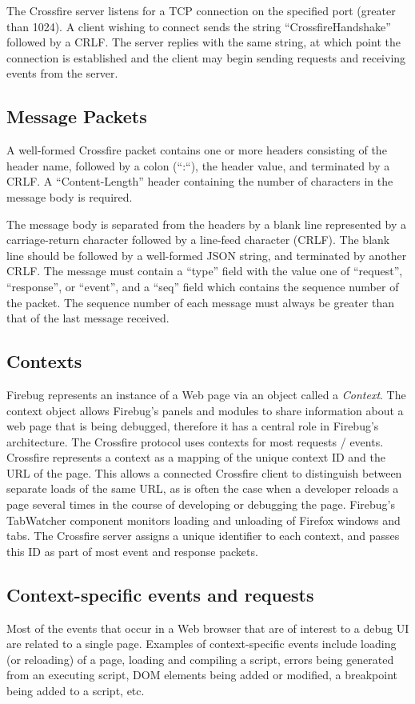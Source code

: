 The Crossfire server listens for a TCP connection on the specified port
(greater than 1024).  A client wishing to connect sends the string
``CrossfireHandshake'' followed by a CRLF. The server replies with the same
string, at which point the connection is established and the client may begin
sending requests and receiving events from the server.

\subsection {Message Packets}
A well-formed Crossfire packet contains one or more headers consisting of the
header name, followed by a colon (``:``), the header value, and terminated by a
CRLF. A ``Content-Length'' header containing the number of characters in the
message body is required.

The message body is separated from the headers by a blank line
represented by a carriage-return character followed by a line-feed
character (CRLF).
The blank line should be followed by a well-formed JSON string, and terminated
by another CRLF. The message must contain a ``type'' field with the value one of
``request'', ``response'', or ``event'', and a ``seq'' field which contains the
sequence number of the packet. The sequence number of each message must always
be greater than that of the last message received.

\subsection {Contexts}
Firebug represents an instance of a Web page via an object called a
\textit{Context}. The context object allows Firebug's panels and modules to
share information about a web page that is being debugged, therefore it has a
central role in Firebug's architecture. The Crossfire protocol uses contexts for
most requests / events. Crossfire represents a context as a mapping of the
unique context ID and the URL of the page. This allows a connected Crossfire
client to distinguish between separate loads of the same URL, as is often the
case when a developer reloads a page several times in the course of developing
or debugging the page.
Firebug's TabWatcher component monitors loading and unloading of Firefox windows
and tabs.  The Crossfire server assigns a unique identifier to each
context, and passes this ID as part of most event and response packets.

\subsection {Context-specific events and requests}
Most of the events that occur in a Web browser that are of interest to a debug
UI are related to a single page. Examples of context-specific events include
loading (or reloading) of a page, loading and compiling a script, errors being
generated from an executing script, DOM elements being added or modified, a
breakpoint being added to a script, etc.

